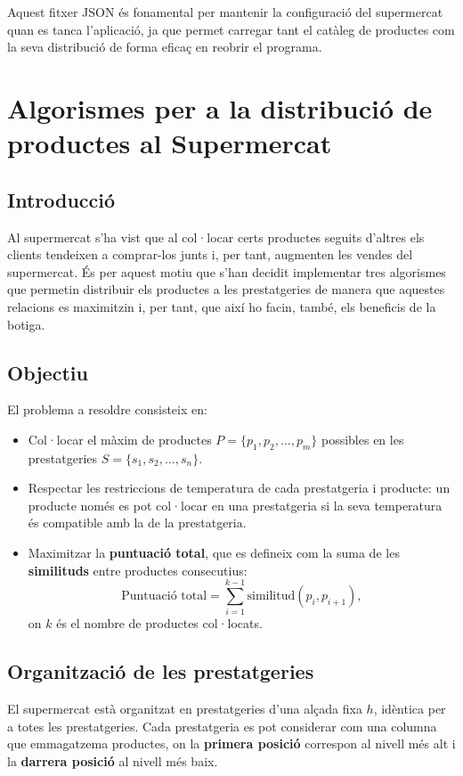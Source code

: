 \documentclass[a4paper,12pt]{report}
\begin{document}
Aquest fitxer JSON és fonamental per mantenir la configuració del supermercat quan es tanca l'aplicació, ja que permet carregar tant el catàleg de productes com la seva distribució de forma eficaç en reobrir el programa.


\chapter{Algorismes per a la distribució de productes al Supermercat}

\section{Introducció}

Al supermercat s'ha vist que al col·locar certs productes seguits d'altres els clients tendeixen a comprar-los junts i, per tant, augmenten les vendes del supermercat.
És per aquest motiu que s'han decidit implementar tres algorismes que permetin distribuir els productes a les prestatgeries de manera que aquestes relacions es maximitzin i, per tant, que així ho facin, també, els beneficis de la botiga.

\section{Objectiu}
El problema a resoldre consisteix en:
\begin{itemize}
	\item Col·locar el màxim de productes \(P = \{p_1, p_2, \dots, p_m\}\) possibles en les prestatgeries \(S = \{s_1, s_2, \dots, s_n\}\).
	\item Respectar les restriccions de temperatura de cada prestatgeria i producte: un producte només es pot col·locar en una prestatgeria si la seva temperatura és compatible amb la de la prestatgeria.
	\item Maximitzar la \textbf{puntuació total}, que es defineix com la suma de les \textbf{similituds} entre productes consecutius:
	      \[
		      \text{Puntuació total} = \sum_{i=1}^{k-1} \text{similitud}(p_i, p_{i+1}),
	      \]
	      on \(k\) és el nombre de productes col·locats.
\end{itemize}

\section{Organització de les prestatgeries}

El supermercat està organitzat en prestatgeries d'una alçada fixa \( h \), idèntica per a totes les prestatgeries. Cada prestatgeria es pot considerar com una columna que emmagatzema productes, on la \textbf{primera posició} correspon al nivell més alt i la \textbf{darrera posició} al nivell més baix.
\end{document}
